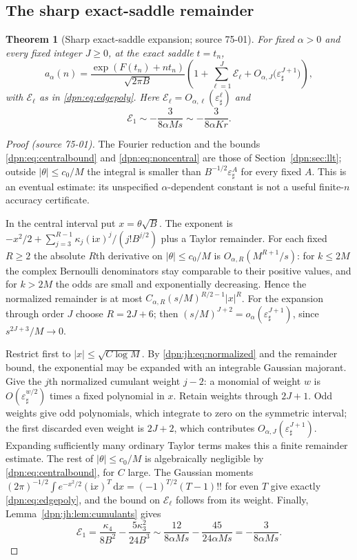 \documentclass[11pt]{article}
\numberwithin{equation}{section}
\newtheorem{theorem}{Theorem}[section]
\theoremstyle{definition}\newtheorem{definition}[theorem]{Definition}
\theoremstyle{remark}\newtheorem{remark}[theorem]{Remark}
\newcommand{\dd}{\,\mathrm d}\newcommand{\ii}{\mathrm i}
\newcommand{\src}[1]{\textup{(source #1)}}
\newcommand{\epsh}{\varepsilon_{\sharp}}
\begin{document}
\subsection{The sharp exact-saddle remainder}
\begin{theorem}[Sharp exact-saddle expansion; source 75-01]\label{dpn:jh:thm:saddle}
For fixed $\alpha>0$ and every fixed integer $J\ge0$, at the exact saddle
$t=t_n$,
\begin{equation}\label{dpn:jh:eq:rel}
 a_\alpha(n)=\frac{\exp(F(t_n)+nt_n)}{\sqrt{2\pi B}}
 \left(1+\sum_{\ell=1}^{J}\mathcal E_\ell+O_{\alpha,J}\bigl(\epsh^{J+1}\bigr)\right),
\end{equation}
with $\mathcal E_\ell$ as in \eqref{dpn:eq:edgepoly}.  Here
$\mathcal E_\ell=O_{\alpha,\ell}(\epsh^\ell)$ and
\begin{equation}\label{dpn:jh:eq:E1lead}
 \mathcal E_1\sim-\frac{3}{8\alpha Ms}\sim-\frac{3}{8\alpha Kr}.
\end{equation}
\end{theorem}
\begin{proof}[Proof \src{75-01}]
The Fourier reduction and the bounds \eqref{dpn:eq:centralbound} and
\eqref{dpn:eq:noncentral} are those of Section~\ref{dpn:sec:llt}; outside
$|\theta|\le c_0/M$ the integral is smaller than $B^{-1/2}\epsh^A$ for every
fixed $A$.  This is an eventual estimate: its unspecified $\alpha$-dependent
constant is not a useful finite-$n$ accuracy certificate.

In the central interval put $x=\theta\sqrt B$.  The exponent is
$-x^2/2+\sum_{j=3}^{R-1}\kappa_j(\ii x)^j/(j!B^{j/2})$ plus a Taylor
remainder.  For each fixed $R\ge2$ the absolute $R$th derivative on
$|\theta|\le c_0/M$ is $O_{\alpha,R}(M^{R+1}/s)$: for $k\le2M$ the complex
Bernoulli denominators stay comparable to their positive values, and for
$k>2M$ the odds are small and exponentially decreasing.  Hence the normalized
remainder is at most $C_{\alpha,R}(s/M)^{R/2-1}|x|^R$.  For the expansion
through order $J$ choose $R=2J+6$; then $(s/M)^{J+2}=o_\alpha(\epsh^{J+1})$,
since $s^{2J+3}/M\to0$.

Restrict first to $|x|\le\sqrt{C\log M}$.  By \eqref{dpn:jh:eq:normalized}
and the remainder bound, the exponential may be expanded with an integrable
Gaussian majorant.  Give the $j$th normalized cumulant weight $j-2$: a monomial
of weight $w$ is $O(\epsh^{w/2})$ times a fixed polynomial in $x$.  Retain
weights through $2J+1$.  Odd weights give odd polynomials, which integrate to
zero on the symmetric interval; the first discarded even weight is $2J+2$,
which contributes $O_{\alpha,J}(\epsh^{J+1})$.  Expanding sufficiently many
ordinary Taylor terms makes this a finite remainder estimate.  The rest of
$|\theta|\le c_0/M$ is algebraically negligible by
\eqref{dpn:eq:centralbound}, for $C$ large.  The Gaussian moments
$(2\pi)^{-1/2}\int e^{-x^2/2}(\ii x)^T\dd x=(-1)^{T/2}(T-1)!!$ for even $T$
give exactly \eqref{dpn:eq:edgepoly}, and the bound on $\mathcal E_\ell$
follows from its weight.  Finally, Lemma~\ref{dpn:jh:lem:cumulants} gives
\[
 \mathcal E_1=\frac{\kappa_4}{8B^2}-\frac{5\kappa_3^2}{24B^3}
 \sim\frac{12}{8\alpha Ms}-\frac{45}{24\alpha Ms}=-\frac{3}{8\alpha Ms}.
\]
\end{proof}
\end{document}
